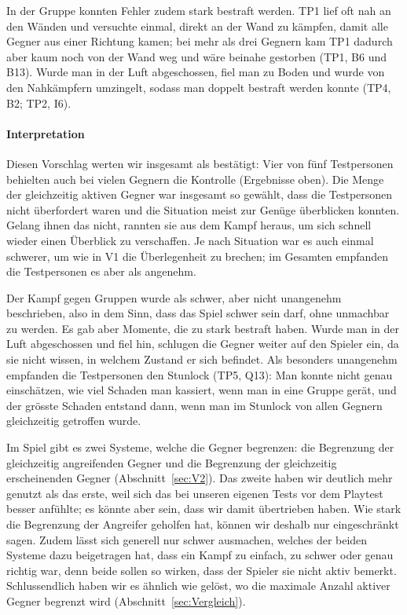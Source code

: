 \documentclass[../Main.tex]{subfiles}
\begin{document}
In der Gruppe konnten Fehler zudem stark bestraft werden. TP1 lief oft nah an den Wänden und versuchte einmal, direkt an der Wand zu kämpfen, damit alle Gegner aus einer Richtung kamen; bei mehr als drei Gegnern kam TP1 dadurch aber kaum noch von der Wand weg und wäre beinahe gestorben (TP1, B6 und B13). Wurde man in der Luft abgeschossen, fiel man zu Boden und wurde von den Nahkämpfern umzingelt, sodass man doppelt bestraft werden konnte (TP4, B2; TP2, I6).

\paragraph{Interpretation}
Diesen Vorschlag werten wir insgesamt als bestätigt: Vier von fünf Testpersonen behielten auch bei vielen Gegnern die Kontrolle (Ergebnisse oben). Die Menge der gleichzeitig aktiven Gegner war insgesamt so gewählt, dass die Testpersonen nicht überfordert waren und die Situation meist zur Genüge überblicken konnten. Gelang ihnen das nicht, rannten sie aus dem Kampf heraus, um sich schnell wieder einen Überblick zu verschaffen. Je nach Situation war es auch einmal schwerer, um wie in V1 die Überlegenheit zu brechen; im Gesamten empfanden die Testpersonen es aber als angenehm.

Der Kampf gegen Gruppen wurde als schwer, aber nicht unangenehm beschrieben, also in dem Sinn, dass das Spiel schwer sein darf, ohne unmachbar zu werden. Es gab aber Momente, die zu stark bestraft haben. Wurde man in der Luft abgeschossen und fiel hin, schlugen die Gegner weiter auf den Spieler ein, da sie nicht wissen, in welchem Zustand er sich befindet. Als besonders unangenehm empfanden die Testpersonen den Stunlock (TP5, Q13): Man konnte nicht genau einschätzen, wie viel Schaden man kassiert, wenn man in eine Gruppe gerät, und der grösste Schaden entstand dann, wenn man im Stunlock von allen Gegnern gleichzeitig getroffen wurde.

Im Spiel gibt es zwei Systeme, welche die Gegner begrenzen: die Begrenzung der gleichzeitig angreifenden Gegner und die Begrenzung der gleichzeitig erscheinenden Gegner (Abschnitt~\ref{sec:V2}). Das zweite haben wir deutlich mehr genutzt als das erste, weil sich das bei unseren eigenen Tests vor dem Playtest besser anfühlte; es könnte aber sein, dass wir damit übertrieben haben. Wie stark die Begrenzung der Angreifer geholfen hat, können wir deshalb nur eingeschränkt sagen. Zudem lässt sich generell nur schwer ausmachen, welches der beiden Systeme dazu beigetragen hat, dass ein Kampf zu einfach, zu schwer oder genau richtig war, denn beide sollen so wirken, dass der Spieler sie nicht aktiv bemerkt. Schlussendlich haben wir es ähnlich wie  gelöst, wo die maximale Anzahl aktiver Gegner begrenzt wird (Abschnitt~\ref{sec:Vergleich}).
\end{document}

